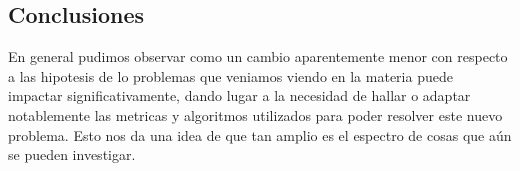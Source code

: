 \documentclass{article}
\begin{document}
        \subsection{Conclusiones}
            En general pudimos observar como un cambio aparentemente menor con respecto a las hipotesis de lo problemas que veniamos viendo en la materia puede impactar significativamente, dando lugar a la necesidad de hallar o adaptar notablemente las metricas y algoritmos utilizados para poder resolver este nuevo problema. Esto nos da una idea de que tan amplio es el espectro de cosas que a\'un se pueden investigar.
            
        
        
\end{document}
